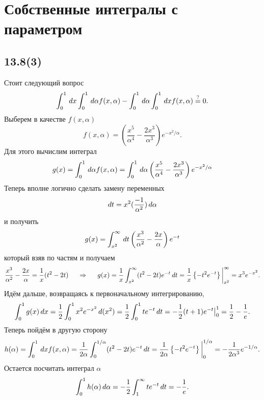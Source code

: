 \section*{Собственные интегралы с параметром}


\subsection*{13.8(3)}


Стоит следующий вопрос
\begin{equation*}
    \int_0^1 \, d x \int_0^1 \, d \alpha f(x, \alpha) - \int_0^1 \, d \alpha \int_0^1 \, d x f(x, \alpha) \overset{?}{=} 0.
\end{equation*}
Выберем в качестве $f(x, \alpha)$ 
\begin{equation*}
    f(x, \alpha) = \left(
        \frac{x^5}{\alpha^4} - \frac{2 x^3}{\alpha^3}
    \right) e^{-x^2/\alpha}.
\end{equation*}
Для этого вычислим интеграл
\begin{equation*}
    g(x) = \int_0^1 \, d \alpha f(x, \alpha) = \int_0^1 \, d \alpha \left(
        \frac{x^5}{\alpha^4} - \frac{2 x^3}{\alpha^3}
    \right) e^{-x^2/\alpha}
\end{equation*}
Теперь вполне логично сделать замену переменных
\begin{equation*}
    d t = x^2 (\frac{-1}{\alpha^2}) \, d \alpha 
\end{equation*}
и получить
\begin{equation*}
    g(x) = \int_{x^2}^{\infty} \, d t \left(
        \frac{x^3}{\alpha^2} - \frac{2 x}{\alpha}
    \right) e^{-t}
\end{equation*}
который взяв по частям и получаем
\begin{equation*}
    \frac{x^3}{\alpha^2} - \frac{2 x}{\alpha} = \frac{1}{x} (t^2 - 2t)
    \hspace{0.5cm} \Rightarrow \hspace{0.5cm}
    g(x) = \frac{1}{x} \int_{x^2}^{\infty} (t^2 - 2t) e^{-t} \, d t = 
    \frac{1}{x} \left\{-t^2 e^{-t}\right\} \bigg|_{x^2}^{\infty} = x^3 e^{-x^2}.
\end{equation*}
Идём дальше, возвращаясь к первоначальному интегрированию,
\begin{equation*}
    \int_0^1 g(x) \, d x = \frac{1}{2} \int_0^1 x^2 e^{-x^2} \, d (x^2) = 
    \frac{1}{2} \int_0^1 t e^{-t} \, d t = - \frac{1}{2} (t+1) e^{-t} \big|_0^1 = \frac{1}{2}-\frac{1}{e}.
\end{equation*}
Теперь пойдём в другую сторону
\begin{equation*}
    h(\alpha) = \int_0^1 \, d x f(x, \alpha) = \frac{1}{2\alpha} \int_0^{1/\alpha} (t^2 - 2t) e^{-t} \, d t = \frac{1}{2\alpha} \left\{
        - t^2 e^{-t}
    \right\}\bigg|^{1/\alpha}_0 = - \frac{1}{2\alpha^3} e^{-1/\alpha}.
\end{equation*}
Остается посчитать интеграл $\alpha$ 
\begin{equation*}
    \int_0^1 h(\alpha) \, d \alpha = - \frac{1}{2} \int_1^{\infty} t e^{-t} \, d t = - \frac{1}{e}.
\end{equation*}


